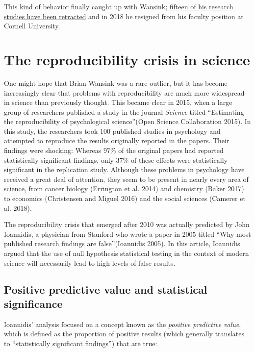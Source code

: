 \documentclass[]{book}
\theoremstyle{definition}
\theoremstyle{definition}
\theoremstyle{definition}
\theoremstyle{remark}
\begin{document}
This kind of behavior finally caught up with Wansink;
\href{https://www.vox.com/science-and-health/2018/9/19/17879102/brian-wansink-cornell-food-brand-lab-retractions-jama}{fifteen
of his research studies have been retracted} and in 2018 he resigned
from his faculty position at Cornell University.

\section{The reproducibility crisis in
science}\label{the-reproducibility-crisis-in-science}

One might hope that Brian Wansink was a rare outlier, but it has become
increasingly clear that problems with reproducibility are much more
widespread in science than previously thought. This became clear in
2015, when a large group of researchers published a study in the journal
\emph{Science} titled ``Estimating the reproducibility of psychological
science''(Open Science Collaboration 2015). In this study, the
researchers took 100 published studies in psychology and attempted to
reproduce the results originally reported in the papers. Their findings
were shocking: Whereas 97\% of the original papers had reported
statistically significant findings, only 37\% of these effects were
statistically significant in the replication study. Although these
problems in psychology have received a great deal of attention, they
seem to be present in nearly every area of science, from cancer biology
(Errington et al. 2014) and chemistry (Baker 2017) to economics
(Christensen and Miguel 2016) and the social sciences (Camerer et al.
2018).

The reproducibility crisis that emerged after 2010 was actually
predicted by John Ioannidis, a physician from Stanford who wrote a paper
in 2005 titled ``Why most published research findings are
false''(Ioannidis 2005). In this article, Ioannidis argued that the use
of null hypothesis statistical testing in the context of modern science
will necessarily lead to high levels of false results.

\subsection{Positive predictive value and statistical
significance}\label{positive-predictive-value-and-statistical-significance}

Ioannidis' analysis focused on a concept known as the \emph{positive
predictive value}, which is defined as the proportion of positive
results (which generally translates to ``statistically significant
findings'') that are true:
\end{document}
